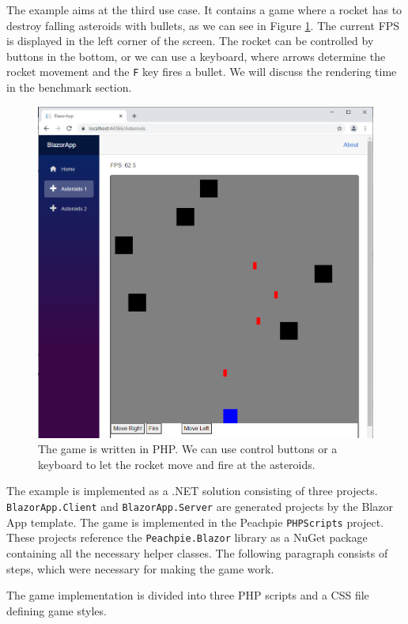 The example aims at the third use case.
It contains a game where a rocket has to destroy falling asteroids with bullets, as we can see in Figure \ref{img28:game}.
The current \ac{FPS} is displayed in the left corner of the screen.
The rocket can be controlled by buttons in the bottom, or we can use a keyboard, where arrows determine the rocket movement and the \texttt{F} key fires a bullet.
We will discuss the rendering time in the benchmark section.
\par
\begin{figure}
\centering
\includegraphics[scale=0.5]{./img/Asteroids}
\caption{The game is written in PHP. We can use control buttons or a keyboard to let the rocket move and fire at the asteroids.}
\label{img28:game}
\end{figure} 
\par
The example is implemented as a .NET solution consisting of three projects. 
\texttt{BlazorApp.Client} and \texttt{BlazorApp.Server} are generated projects by the Blazor App template.
The game is implemented in the Peachpie \texttt{PHPScripts} project.
These projects reference the \texttt{Peachpie.Blazor} library as a NuGet package containing all the necessary helper classes. 
The following paragraph consists of steps, which were necessary for making the game work.
\par
The game implementation is divided into three PHP scripts and a CSS file defining game styles.
